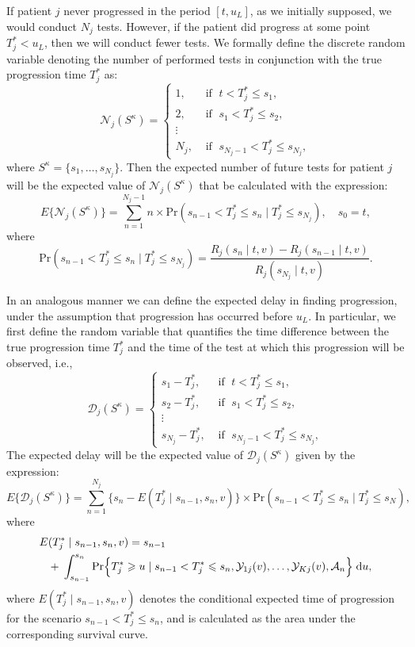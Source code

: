 If patient $j$ never progressed in the period $[t, u_L]$, as we initially supposed, we would conduct $N_j$ tests. However, if the patient did progress at some point $T_j^* < u_L$, then we will conduct fewer tests. We formally define the discrete random variable denoting the number of performed tests in conjunction with the true progression time $T_j^*$ as:
\[
\mathcal N_j (S^\kappa) = \left \{
\begin{array}{ll}
1, & \mbox{ if } \; t < T^*_j \leq s_1,\\
2, & \mbox{ if } \; s_1 < T^*_j \leq s_2,\\
\vdots&\\
N_j, & \mbox{ if } \; s_{N_j-1} < T^*_j \leq s_{N_j},
\end{array}
\right.
\]
where $S^\kappa = \{s_1, \ldots, s_{N_j}\}$. Then the expected number of future tests for patient $j$ will be the expected value of $\mathcal N_j (S^\kappa)$ that be calculated with the expression:
\begin{equation}
E \big \{\mathcal N_j(S^\kappa)\big\} = \sum_{n = 1}^{N_j-1} n \times \mbox{Pr}(s_{n-1} < T^*_j \leq s_n \mid T^*_j \leq s_{N_j}), \quad s_0 = t,
\label{eq:exp_tests}
\end{equation}
where 
\[
\mbox{Pr}(s_{n-1} < T^*_j \leq s_n \mid T^*_j \leq s_{N_j}) = \frac{R_j(s_n \mid t, v) - R_j(s_{n-1} \mid t, v)}{R_j(s_{N_j} \mid t, v)}.
\]

In an analogous manner we can define the expected delay in finding progression, under the assumption that progression has occurred before $u_L$. In particular, we first define the random variable that quantifies the time difference between the true progression time $T_j^*$ and the time of the test at which this progression will be observed, i.e.,
\[
\mathcal D_j (S^\kappa) = \left \{
\begin{array}{ll}
s_1 - T_j^*, & \mbox{ if } \; t < T^*_j \leq s_1,\\
s_2 - T_j^*, & \mbox{ if } \; s_1 < T^*_j \leq s_2,\\
\vdots&\\
s_{N_j} - T_j^*, & \mbox{ if } \; s_{N_j-1} < T^*_j \leq s_{N_j},
\end{array}
\right.
\]
The expected delay will be the expected value of $\mathcal D_j (S^\kappa)$ given by the expression:
\begin{equation}
E \big \{ \mathcal D_j(S^\kappa)\big\} = \sum_{n = 1}^{N_j} \Big\{s_n - E(T^*_j \mid s_{n-1}, s_n, v)\Big\} \times \mbox{Pr}(s_{n-1} < T^*_j \leq s_n\mid T^*_j \leq s_N),
\label{eq:exp_delay}
\end{equation}
where
\begin{eqnarray*}
\lefteqn{E(T^*_j \mid s_{n-1}, s_n, v) = s_{n-1}}\\
&& + \; \int_{s_{n-1}}^{s_n} \mbox{Pr}\Big\{T^*_j \geq u \mid s_{n-1} < T^*_j \leq s_n, \mathcal{Y}_{1j}(v), \ldots, \mathcal{Y}_{Kj}(v), \mathcal{A}_n\Big\} \; \mathrm{d}u,
\end{eqnarray*}
where $E(T^*_j \mid s_{n-1}, s_n, v)$ denotes the conditional expected time of progression for the scenario $s_{n-1} < T^*_j \leq s_n$, and is calculated as the area under the corresponding survival curve.

